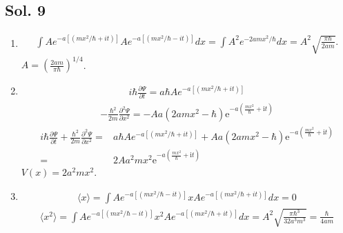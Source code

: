 \subsection*{Sol. 9}
\begin{enumerate}
    \item \begin{align*}
        \int Ae^{-a[(mx^2/\hbar + it)]}Ae^{-a[(mx^2/\hbar - it)]}dx
        = \int A^2e^{-2amx^2/\hbar}dx =
        A^2\sqrt{\frac{\pi\hbar}{2am}}.
    \end{align*}
    $A=\left(\frac{2am}{\pi\hbar}\right)^{1/4}$.
    \item 
    \begin{align*}
        i\hbar\frac{\partial\Psi}{\partial t}=
        a\hbar Ae^{-a[(mx^2/\hbar + it)]}
    \end{align*}
    \begin{align*}
        -\frac{\hbar^2}{2m}\frac{\partial^2 \Psi}{\partial x^2} = 
        -Aa \left(2amx^{2} - \hbar\right) \mathrm{e}^{-a \left(\frac{mx^{2}}{\hbar} + \mathrm{i}t\right)}
    \end{align*}
    \begin{align*}
        i\hbar\frac{\partial\Psi}{\partial t} +
        \frac{\hbar^2}{2m}\frac{\partial^2 \Psi}{\partial x^2} = &
        a\hbar Ae^{-a[(mx^2/\hbar + it)]} + 
        Aa \left(2amx^{2} - \hbar\right) \mathrm{e}^{-a \left(\frac{mx^{2}}{\hbar} + \mathrm{i}t\right)}\\
        =&2Aa^2mx^2\mathrm{e}^{-a \left(\frac{mx^{2}}{\hbar} + \mathrm{i}t\right)}
    \end{align*}
    $V(x)=2a^2mx^2$.
    \item 
    \begin{align*}
        \langle
         x
         \rangle
         =
         \int 
         Ae^{-a[(mx^2/\hbar - it)]}
         x
         Ae^{-a[(mx^2/\hbar + it)]} dx
         = 0
    \end{align*}
    \begin{align*}
        \langle
         x^2
         \rangle
         =
         \int 
         Ae^{-a[(mx^2/\hbar - it)]}
         x^2
         Ae^{-a[(mx^2/\hbar + it)]} dx
         = A^2\sqrt{\frac{\pi\hbar^3}{32a^3m^3}}
        = \frac{\hbar}{4am}
    \end{align*}


\end{enumerate}

